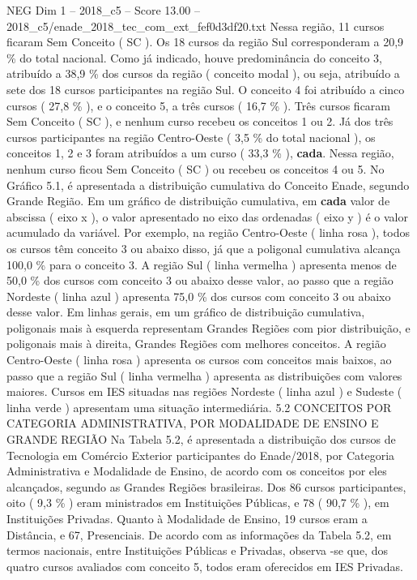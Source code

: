 \begin{textsample}{NEG Dim 1 – 2018\_c5 – Score 13.00 – 2018\_c5/enade\_2018\_tec\_com\_ext\_fef0d3df20.txt}
Nessa região, 11 cursos ficaram Sem Conceito ( SC ).
Os 18 cursos da região Sul corresponderam a 20,9 \% do total nacional.
Como já indicado, houve predominância do conceito 3, atribuído a 38,9 \% dos cursos da região ( conceito modal ), ou seja, atribuído a sete dos 18 cursos participantes na região Sul.
O conceito 4 foi atribuído a cinco cursos ( 27,8 \% ), e o conceito 5, a três cursos ( 16,7 \% ).
Três cursos ficaram Sem Conceito ( SC ), e nenhum curso recebeu os conceitos 1 ou 2.
Já dos três cursos participantes na região Centro-Oeste ( 3,5 \% do total nacional ), os conceitos 1, 2 e 3 foram atribuídos a um curso ( 33,3 \% ), \textbf{cada}.
Nessa região, nenhum curso ficou Sem Conceito ( SC ) ou recebeu os conceitos 4 ou 5.
No Gráfico 5.1, é apresentada a distribuição cumulativa do Conceito Enade, segundo Grande Região.
Em um gráfico de distribuição cumulativa, em \textbf{cada} valor de abscissa ( eixo x ), o valor apresentado no eixo das ordenadas ( eixo y ) é o valor acumulado da variável.
Por exemplo, na região Centro-Oeste ( linha rosa ), todos os cursos têm conceito 3 ou abaixo disso, já que a poligonal cumulativa alcança 100,0 \% para o conceito 3.
A região Sul ( linha vermelha ) apresenta menos de 50,0 \% dos cursos com conceito 3 ou abaixo desse valor, ao passo que a região Nordeste ( linha azul ) apresenta 75,0 \% dos cursos com conceito 3 ou abaixo desse valor.
Em linhas gerais, em um gráfico de distribuição cumulativa, poligonais mais à esquerda representam Grandes Regiões com pior distribuição, e poligonais mais à direita, Grandes Regiões com melhores conceitos.
A região Centro-Oeste ( linha rosa ) apresenta os cursos com conceitos mais baixos, ao passo que a região Sul ( linha vermelha ) apresenta as distribuições com valores maiores.
Cursos em IES situadas nas regiões Nordeste ( linha azul ) e Sudeste ( linha verde ) apresentam uma situação intermediária. 5.2 CONCEITOS POR CATEGORIA ADMINISTRATIVA, POR MODALIDADE DE ENSINO E GRANDE REGIÃO Na Tabela 5.2, é apresentada a distribuição dos cursos de Tecnologia em Comércio Exterior participantes do Enade/2018, por Categoria Administrativa e Modalidade de Ensino, de acordo com os conceitos por eles alcançados, segundo as Grandes Regiões brasileiras.
Dos 86 cursos participantes, oito ( 9,3 \% ) eram ministrados em Instituições Públicas, e 78 ( 90,7 \% ), em Instituições Privadas.
Quanto à Modalidade de Ensino, 19 cursos eram a Distância, e 67, Presenciais.
De acordo com as informações da Tabela 5.2, em termos nacionais, entre Instituições Públicas e Privadas, observa -se que, dos quatro cursos avaliados com conceito 5, todos eram oferecidos em IES Privadas.

\end{textsample}
